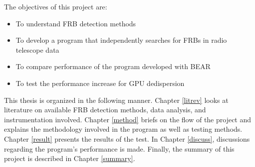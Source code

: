 The objectives of this project are:
\begin{itemize}
    \item To understand FRB detection methods
    \item To develop a program that independently searches for FRBs in radio telescope data
    \item To compare performance of the program developed with BEAR
    \item To test the performance increase for GPU dedispersion 
\end{itemize}

This thesis is organized in the following manner. Chapter \ref{litrev} looks at literature on available FRB detection methods, data analysis, and instrumentation involved. Chapter \ref{method} briefs on the flow of the project and explains the methodology involved in the program as well as testing methods. Chapter \ref{result} presents the results of the test. In Chapter \ref{discuss}, discussions regarding the program's performance is made. Finally, the summary of this project is described in Chapter \ref{summary}.